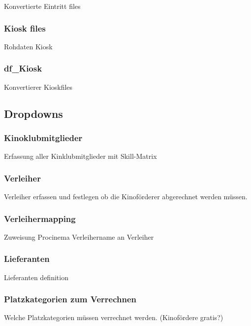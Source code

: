 \documentclass[
]{article}
\begin{document}
Konvertierte Eintritt files

\subsubsection{Kiosk files}\label{kiosk-files}

Rohdaten Kiosk

\subsubsection{df\_Kiosk}\label{df_kiosk}

Konvertierer Kioskfiles

\subsection{Dropdowns}\label{dropdowns}

\subsubsection{Kinoklubmitglieder}\label{kinoklubmitglieder}

Erfassung aller Kinklubmitglieder mit Skill-Matrix

\subsubsection{Verleiher}\label{verleiher}

Verleiher erfassen und festlegen ob die Kinoförderer abgerechnet werden
müssen.

\subsubsection{Verleihermapping}\label{verleihermapping}

Zuweisung Procinema Verleihername an Verleiher

\subsubsection{Lieferanten}\label{lieferanten}

Lieferanten definition

\subsubsection{Platzkategorien zum
Verrechnen}\label{platzkategorien-zum-verrechnen}

Welche Platzkategorien müssen verrechnet werden. (Kinofördere gratis?)
\end{document}
